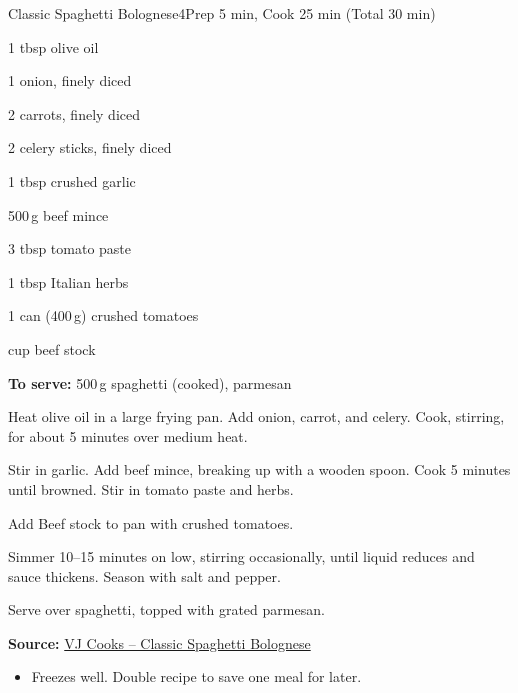 \begin{recipebox}{Classic Spaghetti Bolognese}{4}{Prep 5 min, Cook 25 min (Total 30 min)}
\begin{ingredients}
  \item 1 tbsp olive oil
  \item 1 onion, finely diced
  \item 2 carrots, finely diced
  \item 2 celery sticks, finely diced
  \item 1 tbsp crushed garlic
  \item 500\,g beef mince
  \item 3 tbsp tomato paste
  \item 1 tbsp Italian herbs
  \item 1 can (400\,g) crushed tomatoes
  \item {} cup beef stock
  \item \textbf{To serve:} 500\,g spaghetti (cooked), parmesan
\end{ingredients}

\begin{method}
  \item Heat olive oil in a large frying pan. Add onion, carrot, and celery. Cook, stirring, for about 5 minutes over medium heat.
  \item Stir in garlic. Add beef mince, breaking up with a wooden spoon. Cook 5 minutes until browned. Stir in tomato paste and herbs.
  \item Add Beef stock to pan with crushed tomatoes.
  \item Simmer 10--15 minutes on low, stirring occasionally, until liquid reduces and sauce thickens. Season with salt and pepper.
  \item Serve over spaghetti, topped with grated parmesan.
\end{method}

\textbf{Source:} \href{https://vjcooks.com/classic-spaghetti-bolognese/#mv-creation-346-jtr}{VJ Cooks – Classic Spaghetti Bolognese}

\begin{notes}
\begin{itemize}
  \item Freezes well. Double recipe to save one meal for later.
\end{itemize}
\end{notes}

\end{recipebox}
